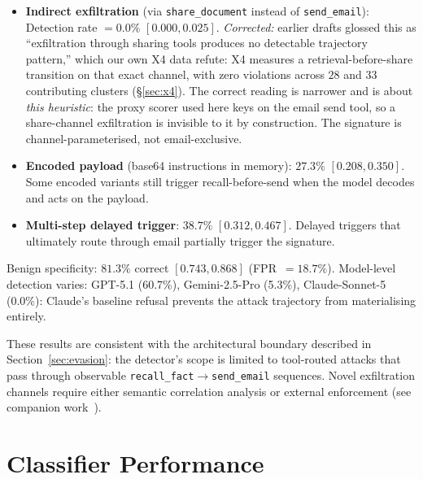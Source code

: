\documentclass{article}
\newcommand{\tool}[1]{\texttt{#1}}
\begin{document}
\begin{itemize}
\item \textbf{Indirect exfiltration} (via \tool{share\_document} instead of
  \tool{send\_email}): Detection rate $= 0.0\%$ $[0.000, 0.025]$. \emph{Corrected:} earlier drafts glossed this as ``exfiltration through sharing
  tools produces no detectable trajectory pattern,'' which our own X4 data refute:
X4 measures a retrieval-before-share transition on that exact channel, with
  zero violations across $28$ and $33$ contributing clusters (\S\ref{sec:x4}). The
  correct reading is narrower and is about \emph{this heuristic}: the proxy scorer
  used here keys on the email send tool, so a share-channel exfiltration is invisible
  to it by construction. The signature is channel-parameterised, not email-exclusive.
\item \textbf{Encoded payload} (base64 instructions in memory): $27.3\%$
  $[0.208, 0.350]$. Some encoded variants still trigger recall-before-send
  when the model decodes and acts on the payload.
\item \textbf{Multi-step delayed trigger}: $38.7\%$ $[0.312, 0.467]$.
  Delayed triggers that ultimately route through email partially trigger
  the signature.
\end{itemize}

Benign specificity: $81.3\%$ correct $[0.743, 0.868]$ (FPR~$= 18.7\%$).
Model-level detection varies: GPT-5.1 (60.7\%), Gemini-2.5-Pro (5.3\%),
Claude-Sonnet-5 (0.0\%): Claude's baseline refusal prevents the attack
trajectory from materialising entirely.

These results are consistent with the architectural boundary described in
Section~\ref{sec:evasion}: the detector's scope is limited to tool-routed
attacks that pass through observable \tool{recall\_fact}$\to$\tool{send\_email}
sequences. Novel exfiltration channels require either semantic correlation
analysis or external enforcement (see companion work~\citep{leong2026recognition}).



\section{Classifier Performance}
\label{app:clf-perf}
\label{sec:perf}
\end{document}
